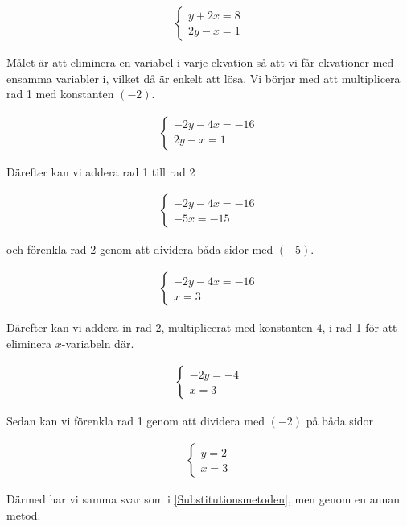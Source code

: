 \begin{align}
	\begin{cases}
		y+2x=8 \\
		2y-x = 1
	\end{cases}
\end{align}

Målet är att eliminera en variabel i varje ekvation så att vi får ekvationer med ensamma variabler i, vilket då är enkelt att lösa. Vi börjar med att multiplicera rad 1 med konstanten $(-2)$.

\begin{align}
	\begin{cases}
		-2y-4x=-16 \\
		2y-x = 1
	\end{cases}
\end{align}

Därefter kan vi addera rad 1 till rad 2

\begin{align}
	\begin{cases}
		-2y-4x=-16 \\
		-5x = -15
	\end{cases}
\end{align}

och förenkla rad 2 genom att dividera båda sidor med $(-5)$.

\begin{align}
	\begin{cases}
		-2y-4x=-16 \\
		x = 3
	\end{cases}
\end{align}

Därefter kan vi addera in rad 2, multiplicerat med konstanten $4$, i rad 1 för att eliminera $x$-variabeln där.

\begin{align}
	\begin{cases}
		-2y=-4 \\
		x = 3
	\end{cases}
\end{align}

Sedan kan vi förenkla rad 1 genom att dividera med $(-2)$ på båda sidor

\begin{align}
	\begin{cases}
		y=2 \\
		x = 3
	\end{cases}
\end{align}

Därmed har vi samma svar som i \ref{Substitutionsmetoden}, men genom en annan metod.






































